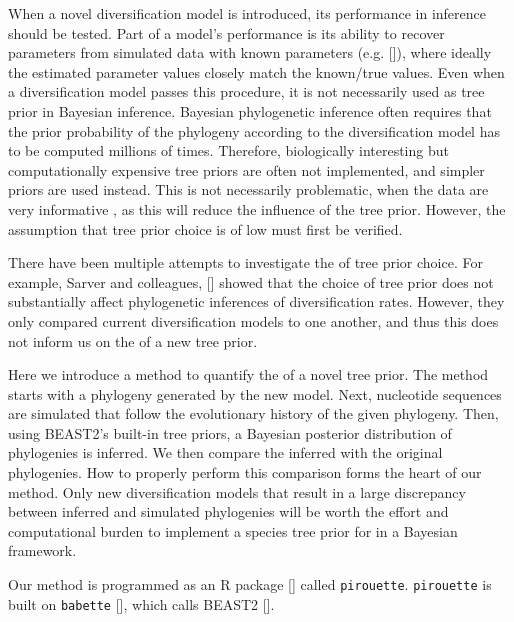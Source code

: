 When a novel diversification model is introduced,
its performance in inference should be tested.
Part of a model's performance is its ability to 
recover parameters from simulated data with known 
parameters (e.g. [\cite{etienne2014estimating}]), 
where ideally the estimated parameter values closely match the known/true values.
Even when a diversification model passes this procedure, 
it is not necessarily used as tree prior in Bayesian inference.
Bayesian phylogenetic inference often requires 
that the prior probability of the phylogeny 
according to the diversification model has to be computed millions of times. 
Therefore, biologically interesting but computationally expensive tree priors 
are often not implemented, and simpler priors are used instead. 
This is not necessarily problematic, when the data are very informative 
, 
as this will reduce the influence of the tree prior.
However, the assumption that tree prior choice is of low  
must first be verified.

There have been multiple attempts to investigate the  of tree
prior choice. For example, Sarver and colleagues, [\cite{sarver2019choice}] 
showed that the choice of tree prior does not 
substantially affect phylogenetic inferences of diversification rates.
However, they only compared current diversification models to one another, 
and thus this does not inform us on the  of a new tree prior.

Here we introduce a method to quantify the  of a novel tree prior.
The method starts with a phylogeny generated by the new model. 
Next, nucleotide sequences are simulated that follow the evolutionary 
history of the given phylogeny. 
Then, using BEAST2's built-in tree priors,
a Bayesian posterior distribution of phylogenies is inferred. 
We then compare the inferred with the original phylogenies. 
How to properly perform this comparison forms the heart of our method.
Only new diversification models that result 
in a large discrepancy between inferred and simulated phylogenies 
will be worth the effort and computational burden to implement 
a species tree prior for in a Bayesian framework.

Our method is programmed as an R package [\cite{R}] called \verb;pirouette;.
\verb;pirouette; is built on \verb;babette; [\cite{bilderbeek2018babette}], 
which calls BEAST2 [\cite{bouckaert2019beast}]. 

